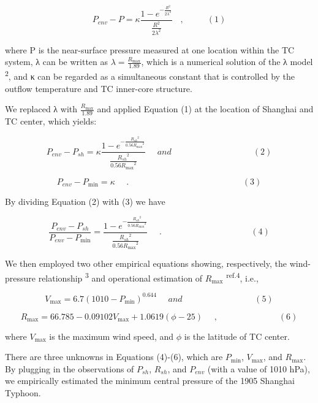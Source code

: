 \documentclass[
]{article}
\begin{document}
\[P_{env} - P = \kappa\frac{1 - e^{- \frac{R^{2}}{2\lambda^{2}}}}{\frac{R^{2}}{2\lambda^{2}}}\ \ \ \ ,\ \ \ \ \ \ \ \ \ \ \ \ (1)
\]

where P is the near-surface pressure measured at one location within the
TC system, λ can be written as \(\lambda = \frac{R_{\max}}{1.89}\),
which is a numerical solution of the λ model \textsuperscript{2}, and κ
can be regarded as a simultaneous constant that is controlled by the
outflow temperature and TC inner-core structure.

We replaced λ with \(\frac{R_{\max}}{1.89}\) and applied Equation (1) at
the location of Shanghai and TC center, which yields:

\[P_{env} - P_{sh} = \kappa\frac{1 - e^{- \frac{{R_{sh}}^{2}}{0.56{R_{\max}}^{2}}}}{\frac{{R_{sh}}^{2}}{0.56{R_{\max}}^{2}}}\ \ \ \ \ \ and\ \ \ \ \ \ \ \ \ \ \ \ \ \ \ \ \ \ \ \ \ \ \ \ \ \ \ \ \ \ \ \ \ \ \ \ \ \ \ \ \ \ \ (2)\]

\[P_{env} - P_{\min} = \kappa\ \ \ \ \ \ .\ \ \ \ \ \ \ \ \ \ \ \ \ \ \ \ \ \ \ \ \ \ \ \ \ \ \ \ \ \ \ \ \ \ \ \ \ \ \ \ \ \ \ \ \ \ \ \ \ \ \ \ \ \ \ \ \ \ \ \ (3)\]

By dividing Equation (2) with (3) we have

\[\frac{P_{env} - P_{sh}}{P_{env} - P_{\min}} = \frac{1 - e^{- \frac{{R_{sh}}^{2}}{0.56{R_{\max}}^{2}}}}{\frac{{R_{sh}}^{2}}{0.56{R_{\max}}^{2}}}\ \ \ \ \ \ .\ \ \ \ \ \ \ \ \ \ \ \ \ \ \ \ \ \ \ \ \ \ \ \ \ \ \ \ \ \ \ \ \ \ \ \ \ \ \ \ \ \ \ \ \ \ \ (4)
\]

We then employed two other empirical equations showing, respectively,
the wind-pressure relationship \textsuperscript{3} and operational
estimation of \(R_{\max}\) \textsuperscript{ref.4}, i.e.,

\[V_{\max} = 6.7\left( 1010 - P_{\min} \right)^{0.644}\ \ \ \ \ \ and\ \ \ \ \ \ \ \ \ \ \ \ \ \ \ \ \ \ \ \ \ \ \ \ \ \ \ \ \ \ \ \ \ \ \ \ \ \ (5)\]

\[R_{\max} = 66.785 - 0.09102V_{\max} + 1.0619(\phi - 25)\ \ \ \ \ \ ,\ \ \ \ \ \ \ \ \ \ \ \ \ \ \ \ \ \ \ \ \ \ \ \ \ \ \ \ \ \ \ \ (6)\]

where \(V_{\max}\) is the maximum wind speed, and \(\phi\) is the
latitude of TC center.

There are three unknowns in Equations (4)-(6), which are \(P_{\min}\),
\(V_{\max}\), and \(R_{\max}\). By plugging in the observations of
\(P_{sh}\), \(R_{sh}\), and \(P_{env}\) (with a value of 1010 hPa), we
empirically estimated the minimum central pressure of the 1905 Shanghai
Typhoon.
\end{document}
